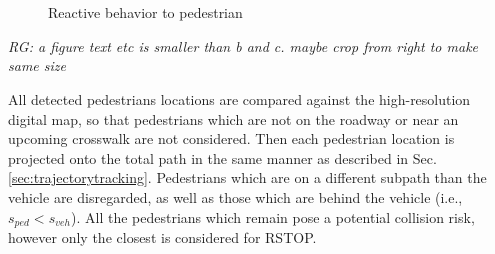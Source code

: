 \documentclass[letterpaper, 10 pt, conference]{ieeeconf}  %
\begin{document}
\begin{figure}[thpb]
\centering
  \\
  \\
  \caption{Reactive behavior to pedestrian}
  \label{fig:react}
\end{figure}
\emph{RG: a figure text etc is smaller than b and c. maybe crop from right to make same size}

All detected pedestrians locations are compared against the high-resolution digital map, so that pedestrians which are not on the roadway or near an upcoming crosswalk are not considered.
Then each pedestrian location is projected onto the total path in the same manner as described in Sec. \ref{sec:trajectorytracking}.
Pedestrians which are on a different subpath than the vehicle are disregarded, as well as those which are behind the vehicle (i.e., $s_{ped} < s_{veh}$).
All the pedestrians which remain pose a potential collision risk, however only the closest is considered for RSTOP.
\end{document}
